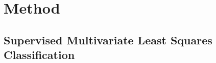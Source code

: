 \documentclass{llncs}
\begin{document}
% 
% 
% 
\section{Method}
\label{section:method}

\subsection{Supervised Multivariate Least Squares Classification} \label{section:leastsquares}
\end{document}

